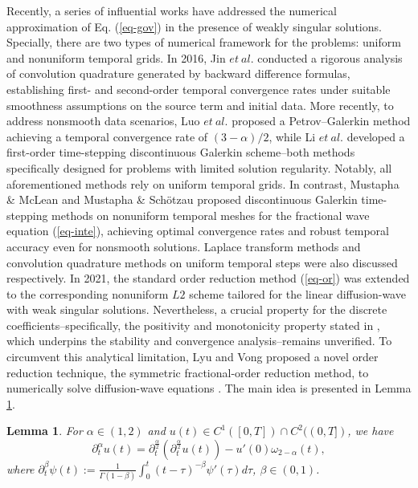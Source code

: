 \documentclass[11pt]{article}
\newtheorem{lemma}{Lemma}[section]
\numberwithin{equation}{section}
\begin{document}
Recently, a series of influential works have addressed the numerical approximation of Eq. (\ref{eq-gov}) in the presence of weakly singular solutions. Specially, there are two types of numerical framework for the problems: uniform \cite{Jin2016,Jin2016wave,Xu2007,Luo2019} and nonuniform \cite{Kopteva2019,LiaoH2018L1,Liao2021,Stynes2017} temporal grids. In 2016, Jin $et~al.$ \cite{Jin2016wave} conducted a rigorous analysis of convolution quadrature generated by backward difference formulas, establishing first- and second-order temporal convergence rates under suitable smoothness assumptions on the source term and initial data.    More recently, to address nonsmooth data scenarios, Luo $et~al.$ \cite{Luo2019} proposed a Petrov–Galerkin method achieving a temporal convergence rate of $(3-\alpha)/2$, while Li $et~al.$ \cite{LiB2020} developed a first-order time-stepping discontinuous Galerkin scheme--both methods specifically designed for problems with limited solution regularity. Notably, all aforementioned methods rely on uniform temporal grids. In contrast, Mustapha \& McLean \cite{Mustapha2014} and Mustapha \& Sch\"{o}tzau \cite{Mustapha2013} proposed discontinuous Galerkin time-stepping methods on nonuniform temporal meshes for the fractional wave equation (\ref{eq-inte}), achieving optimal convergence rates and robust temporal accuracy even for nonsmooth solutions.  Laplace transform methods and convolution quadrature methods
on uniform temporal steps were also discussed respectively. In 2021, the standard order reduction method (\ref{eq-or}) was extended  to the corresponding
nonuniform $L2$ scheme tailored for the linear diffusion-wave with weak singular solutions.
Nevertheless, a crucial property for the discrete coefficients--specifically, the positivity and monotonicity property stated in \cite[Assumption 4.1]{Shen2021}, which underpins the stability and convergence analysis--remains unverified. To circumvent this analytical limitation, Lyu and Vong proposed a novel order reduction technique, the symmetric fractional-order reduction method, to numerically solve diffusion-wave equations \cite{LyuP2022SFOR}. The main idea is presented in Lemma \ref{lem-sym}.
\begin{lemma}\label{lem-sym}
For $\alpha\in(1,2)$ and $u(t)\in C^1([0,T])\cap C^2((0,T])$, we have
\[
\partial_t^\alpha u(t)=\partial_t^{\frac{\alpha}{2}}(\partial_t^{\frac{\alpha}{2}}u(t))-u'(0)\omega_{2-\alpha}(t),
\]
where $\partial_t^\beta \psi(t) := \frac{1}{\Gamma(1 - \beta)} \int_0^t (t-\tau)^{-\beta} \psi'(\tau) d\tau$, $\beta\in(0,1)$.
\end{lemma}
\end{document}
